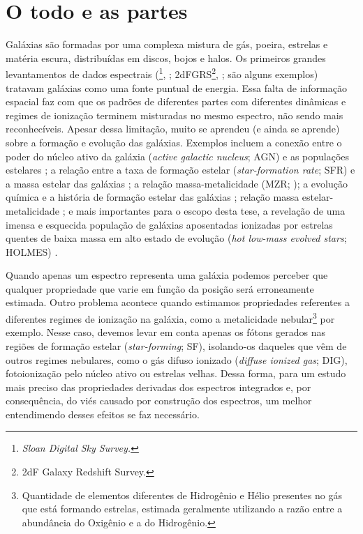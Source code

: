 \section{O todo e as partes}
\label{sec:intro:partes}

Galáxias são formadas por uma complexa mistura de gás, poeira, estrelas e matéria escura, distribuídas em discos, bojos e halos. Os primeiros grandes levantamentos de dados espectrais (\SDSS\footnote{\em Sloan Digital Sky Survey.}, \citealt{York.etal.2000a};
2dFGRS\footnote{2dF Galaxy Redshift Survey.}, \citealt{Colless.etal.2001a}; são alguns exemplos) tratavam galáxias como uma fonte puntual de energia. Essa falta de informação espacial faz com que os padrões de diferentes partes com diferentes dinâmicas e regimes de ionização terminem misturadas no mesmo espectro, não sendo mais reconhecíveis. Apesar dessa limitação, muito se aprendeu (e ainda se aprende) sobre a formação e evolução das galáxias. Exemplos incluem a conexão entre o poder do núcleo ativo da galáxia ({\em active galactic nucleus}; AGN) e as populações estelares \citep{Kauffmann.etal.2003a}; a relação entre a taxa de formação estelar ({\em star-formation rate}; SFR) e a massa estelar das galáxias \citep{Brinchmann.etal.2004a}; a relação massa-metalicidade (MZR; \citealt{Tremonti.etal.2004a}); a evolução química e a história de formação estelar das galáxias \citep{CidFernandes.etal.2007, Asari.etal.2007a}; relação massa estelar-metalicidade \citep{ValeAsari.etal.2009a}; e mais importantes para o escopo desta tese, a revelação de uma imensa e esquecida população de galáxias aposentadas ionizadas por estrelas quentes de baixa massa em alto estado de evolução ({\em hot low-mass evolved stars}; HOLMES) \citep{Stasinska.etal.2008a, CidFernandes.etal.2010a, CidFernandes.etal.2011a}.

Quando apenas um espectro representa uma galáxia podemos perceber que qualquer propriedade que varie em função da posição será erroneamente estimada. Outro problema acontece quando estimamos propriedades referentes a diferentes regimes de ionização na galáxia, como a metalicidade nebular\footnote{Quantidade de elementos diferentes de Hidrogênio e Hélio presentes no gás que está formando estrelas, estimada geralmente utilizando a razão entre a abundância do Oxigênio e a do Hidrogênio.} por exemplo. Nesse caso, devemos levar em conta apenas os fótons gerados nas regiões de formação estelar ({\em star-forming}; SF), isolando-os daqueles que vêm de outros regimes nebulares, como o gás difuso ionizado ({\em diffuse ionized gas}; DIG), fotoionização pelo núcleo ativo ou estrelas velhas. Dessa forma, para um estudo mais preciso das propriedades derivadas dos espectros integrados e, por consequência, do viés causado por construção dos espectros, um melhor entendimendo desses efeitos se faz necessário.

